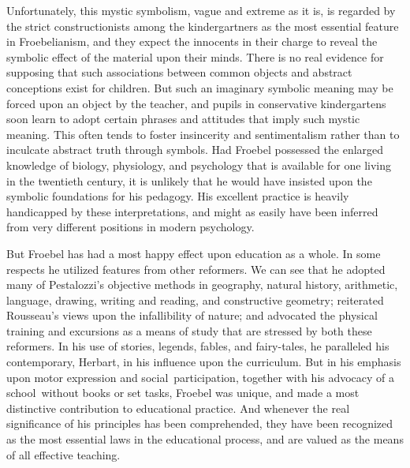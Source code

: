 \documentclass[]{book}
\begin{document}
Unfortunately, this mystic symbolism, vague and extreme as it is, is regarded by the strict constructionists among the kindergartners as the most essential feature in Froebelianism, and they expect the innocents in their charge to reveal the symbolic effect of the material upon their minds. There is no real evidence for supposing that such associations between common objects and abstract conceptions exist for children. But such an imaginary symbolic meaning may be forced upon an object by the teacher, and pupils in conservative kindergartens soon learn to adopt certain phrases and attitudes that imply such mystic meaning. This often tends to foster insincerity and sentimentalism rather than to inculcate abstract truth through symbols. Had Froebel possessed the enlarged knowledge of biology, physiology, and psychology that is available for one living in the twentieth century, it is unlikely that he would have insisted upon the symbolic foundations for his pedagogy. His excellent practice is heavily handicapped by these interpretations, and might as easily have been inferred from very different positions in modern psychology.

But Froebel has had a most happy effect upon education as a whole. In some respects he utilized features from other reformers. We can see that he adopted many of Pestalozzi's objective methods in geography, natural history, arithmetic, language, drawing, writing and reading, and constructive geometry; reiterated Rousseau's views upon the infallibility of nature; and advocated the physical training and excursions as a means of study that are stressed by both these reformers. In his use of stories, legends, fables, and fairy-tales, he paralleled his contemporary, Herbart, in his influence upon the curriculum. But in his emphasis upon motor expression and social~participation, together with his advocacy of a school~without books or set tasks, Froebel was unique, and made a most distinctive contribution to educational practice. And whenever the real significance of his principles has been comprehended, they have been recognized as the most essential laws in the educational process, and are valued as the means of all effective teaching.
\end{document}
